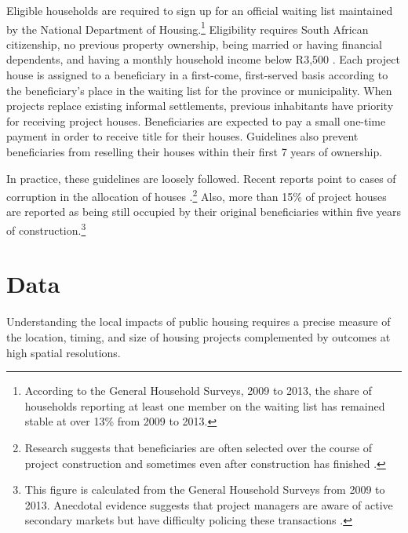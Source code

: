 \documentclass[12pt]{article}
\begin{document}
Eligible households are required to sign up for an official waiting list maintained by the National Department of Housing.\footnote{According to the General Household Surveys, 2009 to 2013, the share of households reporting at least one member on the waiting list has remained stable at over 13\% from 2009 to 2013.}  Eligibility requires South African citizenship, no previous property ownership, being married or having financial dependents, and having a monthly household income below R3,500 \citep{seriq}.  Each project house is assigned to a beneficiary in a first-come, first-served basis according to the beneficiary's place in the waiting list for the province or municipality. When projects replace existing informal settlements, previous inhabitants have priority for receiving project houses.  Beneficiaries are expected to pay a small one-time payment in order to receive title for their houses.  Guidelines also prevent beneficiaries from reselling their houses within their first 7 years of ownership.   %

In practice, these guidelines are loosely followed.  Recent reports point to cases of corruption in the allocation of houses \citep{seriq}.\footnote{Research suggests that beneficiaries are often selected over the course of project construction and sometimes even after construction has finished \citep{seriq}.}  Also, more than 15\% of project houses are reported as being still occupied by their original beneficiaries within five years of construction.\footnote{This figure is calculated from the General Household Surveys from 2009 to 2013. Anecdotal evidence suggests that project managers are aware of active secondary markets but have difficulty policing these transactions \citep{resale}.} 




\section{Data}\label{section:data}

Understanding the local impacts of public housing requires a precise measure of the location, timing, and size of housing projects complemented by outcomes at high spatial resolutions.
\end{document}
